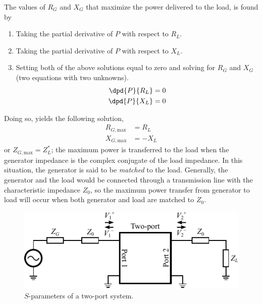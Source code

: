 The values of $R_G$ and $X_G$ that maximize the power delivered to the load, is found by 
\begin{enumerate}
\item Taking the partial derivative of $P$ with respect to $R_L$.
\item Taking the partial derivative of $P$ with respect to $X_L$.
\item Setting both of the above solutions equal to zero and solving for $R_G$ and $X_G$ (two equations with two unknowns).
    \begin{align}
        \dpd{P}{R_L} &= 0 \\
        \dpd{P}{X_L} &= 0
    \end{align}
\end{enumerate}
Doing so, yields the following solution,
\begin{equation}
    \begin{aligned}
        R_{G,\text{max}} &= R_L \\
        X_{G,\text{max}} &= -X_L
    \end{aligned}
\end{equation}
or $Z_{G,\text{max}} = Z^*_L$; the maximum power is transferred to the load when the generator impedance is the complex conjugate of the load impedance. In this situation, the generator is said to be \emph{matched} to the load. Generally, the generator and the load would be connected through a transmission line with the characteristic impedance $Z_0$, so the maximum power transfer from generator to load will occur when both generator and load are matched to $Z_0$. 

\begin{figure}[htbp]
    \centering
    \includegraphics{img/analysis/s_parameter_twoport}
    \caption{$S$-parameters of a two-port system.}
    \label{fig:twoport}
\end{figure}

